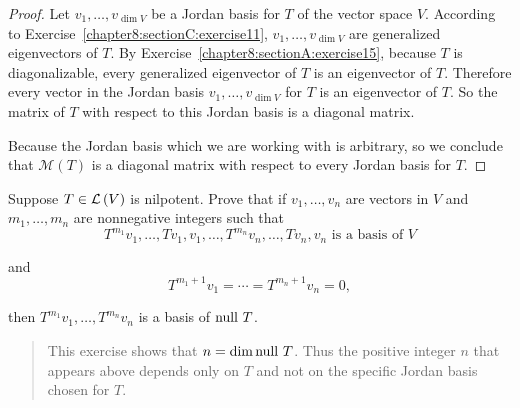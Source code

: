 \begin{proof}
    Let $v_{1}, \ldots, v_{\dim V}$ be a Jordan basis for $T$ of the vector space $V$. According to Exercise~\ref{chapter8:sectionC:exercise11}, $v_{1}, \ldots, v_{\dim V}$ are generalized eigenvectors of $T$. By Exercise~\ref{chapter8:sectionA:exercise15}, because $T$ is diagonalizable, every generalized eigenvector of $T$ is an eigenvector of $T$. Therefore every vector in the Jordan basis $v_{1}, \ldots, v_{\dim V}$ for $T$ is an eigenvector of $T$. So the matrix of $T$ with respect to this Jordan basis is a diagonal matrix.

    Because the Jordan basis which we are working with is arbitrary, so we conclude that $\mathcal{M}(T)$ is a diagonal matrix with respect to every Jordan basis for $T$.
\end{proof}
\newpage

\begin{exercise}\label{chapter8:sectionC:exercise13}
    Suppose $T\in\mathcal{L}\left({V}\right)$ is nilpotent. Prove that if $v_{1}, \ldots, v_{n}$ are vectors in $V$ and $m_{1}, \ldots, m_{n}$ are nonnegative integers such that
    \[
        T^{m_{1}}v_{1}, \ldots, Tv_{1}, v_{1}, \ldots, T^{m_{n}}v_{n}, \ldots, Tv_{n}, v_{n} \text{ is a basis of $V$}
    \]

    and
    \[
        T^{m_{1}+1}v_{1} = \cdots = T^{m_{n}+1}v_{n} = 0,
    \]

    then $T^{m_{1}}v_{1}, \ldots, T^{m_{n}}v_{n}$ is a basis of $\operatorname{null}\,{T}$.
\end{exercise}

\begin{quote}
    This exercise shows that $n = \dim \operatorname{null}\,{T}$. Thus the positive integer $n$ that appears above depends only on $T$ and not on the specific Jordan basis chosen for $T$.
\end{quote}

